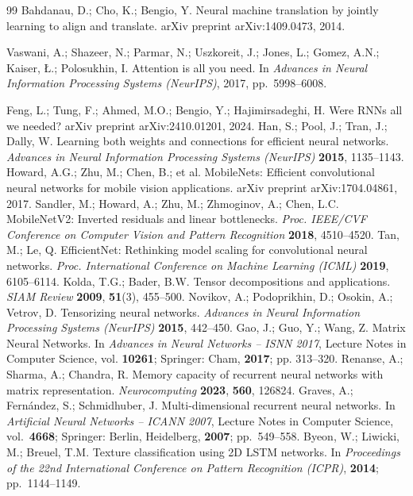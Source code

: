 \documentclass[pdflatex,sn-mathphys-num]{sn-jnl}%
\theoremstyle{thmstyleone}%
\theoremstyle{thmstyletwo}%
\theoremstyle{thmstylethree}%
\begin{document}
\begin{thebibliography}{99}
 Bahdanau, D.; Cho, K.; Bengio, Y. Neural machine translation by jointly learning to align and translate. arXiv preprint arXiv:1409.0473, 2014.

 Vaswani, A.; Shazeer, N.; Parmar, N.; Uszkoreit, J.; Jones, L.; Gomez, A.N.; Kaiser, Ł.; Polosukhin, I. Attention is all you need. In \textit{Advances in Neural Information Processing Systems (NeurIPS)}, 2017, pp.~5998--6008. 

 Feng, L.; Tung, F.; Ahmed, M.O.; Bengio, Y.; Hajimirsadeghi, H. Were RNNs all we needed? arXiv preprint arXiv:2410.01201, 2024.
 Han, S.; Pool, J.; Tran, J.; Dally, W. Learning both weights and connections for efficient neural networks. \textit{Advances in Neural Information Processing Systems (NeurIPS)} \textbf{2015}, 1135--1143. 
 Howard, A.G.; Zhu, M.; Chen, B.; et al. MobileNets: Efficient convolutional neural networks for mobile vision applications. arXiv preprint arXiv:1704.04861, 2017.
 Sandler, M.; Howard, A.; Zhu, M.; Zhmoginov, A.; Chen, L.C. MobileNetV2: Inverted residuals and linear bottlenecks. \textit{Proc. IEEE/CVF Conference on Computer Vision and Pattern Recognition} \textbf{2018}, 4510--4520.  Tan, M.; Le, Q. EfficientNet: Rethinking model scaling for convolutional neural networks. \textit{Proc. International Conference on Machine Learning (ICML)} \textbf{2019}, 6105--6114. 
 Kolda, T.G.; Bader, B.W. Tensor decompositions and applications. \textit{SIAM Review} \textbf{2009}, \textbf{51}(3), 455--500. 
 Novikov, A.; Podoprikhin, D.; Osokin, A.; Vetrov, D. Tensorizing neural networks. \textit{Advances in Neural Information Processing Systems (NeurIPS)} \textbf{2015}, 442--450. 
 Gao, J.; Guo, Y.; Wang, Z. Matrix Neural Networks.
In \textit{Advances in Neural Networks -- ISNN 2017}, Lecture Notes in
Computer Science, vol. \textbf{10261}; Springer: Cham, \textbf{2017};
pp. 313--320.
 Renanse, A.; Sharma, A.; Chandra, R. Memory capacity of recurrent neural networks with matrix representation. \textit{Neurocomputing} \textbf{2023}, \textbf{560}, 126824.
 Graves, A.; Fern\'{a}ndez, S.; Schmidhuber, J. Multi-dimensional recurrent neural networks. In \textit{Artificial Neural Networks -- ICANN 2007}, Lecture Notes in Computer Science, vol.~\textbf{4668}; Springer: Berlin, Heidelberg, \textbf{2007}; pp.~549--558.
 Byeon, W.; Liwicki, M.; Breuel, T.M. Texture classification using 2D LSTM networks. In \textit{Proceedings of the 22nd International Conference on Pattern Recognition (ICPR)}, \textbf{2014}; pp.~1144--1149.

\end{thebibliography}
\end{document}
